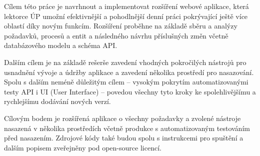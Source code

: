 Cílem této práce je navrhnout a implementovat rozšíření webové aplikace, která lektorce ÚP umožní efektivnější a pohodlnější denní práci pokrývající ještě více oblastí díky novým funkcím. Rozšíření proběhne na základě sběru a analýzy požadavků, procesů a entit a následného návrhu příslušných změn včetně databázového modelu a schéma API.

Dalším cílem je na základě rešerše zavedení vhodných pokročilých nástrojů pro usnadnění vývoje a údržby aplikace a zavedení několika prostředí pro nasazování. Spolu s dalším neméně důležitým cílem -- vysokým pokrytím automatizovanými testy API i UI (User Interface) -- povedou všechny tyto kroky ke spolehlivějšímu a rychlejšímu dodávání nových verzí.

Cílovým bodem je rozšířená aplikace o všechny požadavky a zvolené nástroje nasazená v několika prostředích včetně produkce s automatizovaným testováním před nasazením. Zdrojové kódy také budou spolu s instrukcemi pro spuštění a dalším popisem zveřejněny pod open-source licencí.


